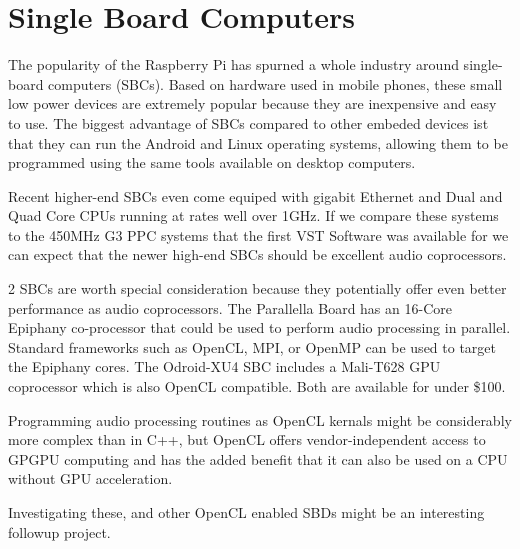\section{Single Board Computers}

The popularity of the Raspberry Pi has spurned a whole industry around single-board computers (SBCs). Based on hardware used in mobile phones, these small low power devices are extremely popular because they are inexpensive and easy to use. The biggest advantage of SBCs compared to other embeded devices ist that they can run the Android and Linux operating systems, allowing them to be programmed using the same tools available on desktop computers.

Recent higher-end SBCs even come equiped with gigabit Ethernet and Dual and Quad Core CPUs running at rates well over 1GHz. If we compare these systems to the 450MHz G3 PPC systems that the first VST Software was available for we can expect that the newer high-end SBCs should be excellent audio coprocessors.

2 SBCs are worth special consideration because they potentially offer even better performance as audio coprocessors. The Parallella Board has an 16-Core Epiphany co-processor that could be used to perform audio processing in parallel. Standard frameworks such as OpenCL, MPI, or OpenMP can be used to target the Epiphany cores. The Odroid-XU4 SBC includes a Mali-T628 GPU coprocessor which is also OpenCL compatible. Both are available for under \$100.

Programming audio processing routines as OpenCL kernals might be considerably more complex than in C++, but OpenCL offers vendor-independent access to GPGPU computing and has the added benefit that it can also be used on a CPU without GPU acceleration\cite{vst-gpu}.

Investigating these, and other OpenCL enabled SBDs might be an interesting followup project.